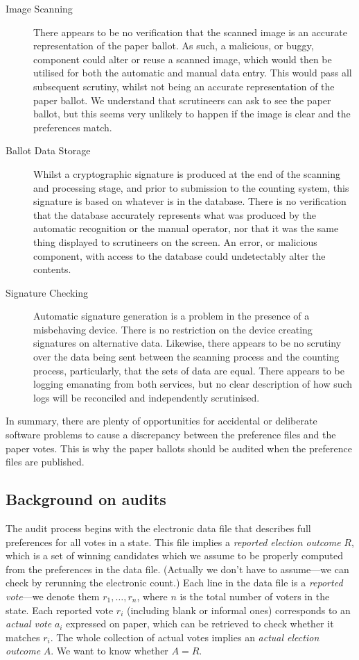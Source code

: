 \documentclass[10pt,a4paper]{article}
\newcommand{\VTNote}[1]{}
\begin{document}
\begin{description}
	\item[Image Scanning] There appears to be no verification that the scanned image is an accurate representation of the paper ballot. As such, a malicious, or buggy, component could alter or reuse a scanned image, which would then be utilised for both the automatic and manual data entry. This would pass all subsequent scrutiny, whilst not being an accurate representation of the paper ballot.  We understand that scrutineers can ask to see the paper ballot, but this seems very unlikely to happen if the image is clear and the preferences match.
	\item[Ballot Data Storage] Whilst a cryptographic signature is produced at the end of the scanning and processing stage, and prior to submission to the counting system, this signature is based on whatever is in the database. There is no verification that the database accurately represents what was produced by the automatic recognition or the manual operator, nor that it was the same thing displayed to scrutineers on the screen. An error, or malicious component, with access to the database could undetectably alter the contents. 
	\item[Signature Checking] Automatic signature generation is a problem in the presence of a misbehaving device. There is no restriction on the device creating signatures on alternative data. Likewise, there appears to be no scrutiny over the data being sent between the scanning process and the counting process, particularly, that the sets of data are equal. There appears to be logging emanating from both services, but no clear description of how such logs will be reconciled and independently scrutinised. 
\end{description}

In summary, there are plenty of opportunities for accidental or deliberate software problems to cause a discrepancy between the preference files and the paper votes.  This is why the paper ballots should be audited when the preference files are published.

\subsection{Background on audits}
The audit process begins with the electronic data file that describes full preferences for all votes in a state.  This file implies a \emph{reported election outcome} $R$, which is a set of winning candidates which we assume to be properly computed from the preferences in the data file.  (Actually we don't have to assume---we can check by rerunning the electronic count.)  Each line in the data file is a \emph{reported vote}---we denote them $r_1,\ldots,r_n$, where $n$ is the total number of voters in the state.  Each reported vote $r_i$ (including blank or informal ones) corresponds to an \emph{actual vote} $a_i$ expressed on paper, which can be retrieved to check whether it matches $r_i$\VTNote{\footnote{What about omissions?}}.   The whole collection of actual votes implies an \emph{actual election outcome} $A$.  We want to know whether $A = R$.
\end{document}
